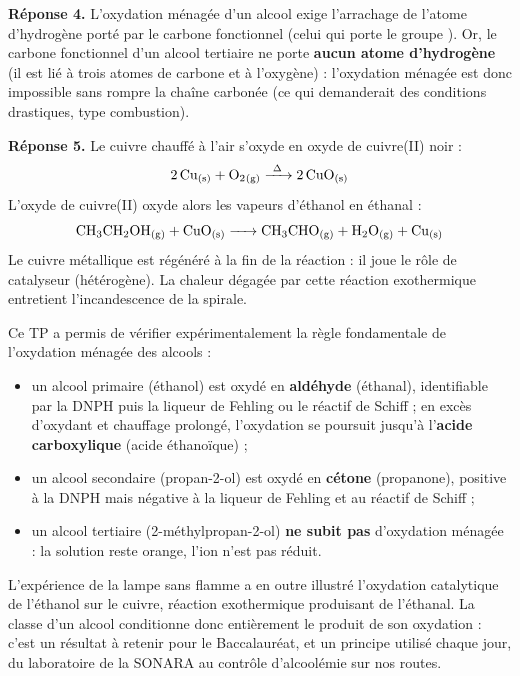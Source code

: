 \documentclass[11pt]{article}
\newcommand{\cle}[1]{{\popxbold\color{popdark}#1}}
\newcounter{popsec}
\newcounter{popsub}
\newcommand{\courssub}[1]{%
  \stepcounter{popsub}%
  \par\vspace{9pt}\noindent{\popxbold\fontsize{11.5}{13}\selectfont\color{popink}{\color{poporange}\thepopsec.\thepopsub}\hspace{6pt}#1}\par\nopagebreak\vspace{4pt}
}
\begin{document}
\begin{exoresolu}
\textbf{Réponse 4.} L'oxydation ménagée d'un alcool exige l'arrachage de l'atome d'hydrogène porté par le carbone fonctionnel (celui qui porte le groupe ). Or, le carbone fonctionnel d'un alcool tertiaire ne porte \textbf{aucun atome d'hydrogène} (il est lié à trois atomes de carbone et à l'oxygène) : l'oxydation ménagée est donc impossible sans rompre la chaîne carbonée (ce qui demanderait des conditions drastiques, type combustion).

\textbf{Réponse 5.} Le cuivre chauffé à l'air s'oxyde en oxyde de cuivre(II) noir  :
\[ \ce{2 Cu_{(s)} + O2_{(g)} ->[\Delta] 2 CuO_{(s)}} \]
L'oxyde de cuivre(II) oxyde alors les vapeurs d'éthanol en éthanal :
\[ \ce{CH3CH2OH_{(g)} + CuO_{(s)} -> CH3CHO_{(g)} + H2O_{(g)} + Cu_{(s)}} \]
Le cuivre métallique est régénéré à la fin de la réaction : il joue le rôle de \cle{catalyseur} (hétérogène). La chaleur dégagée par cette réaction exothermique entretient l'incandescence de la spirale.
\end{exoresolu}

\courssub{Conclusion}

Ce TP a permis de vérifier expérimentalement la règle fondamentale de l'oxydation ménagée des alcools :
\begin{itemize}
\item un alcool \cle{primaire} (éthanol) est oxydé en \textbf{aldéhyde} (éthanal), identifiable par la DNPH puis la liqueur de Fehling ou le réactif de Schiff ; en excès d'oxydant et chauffage prolongé, l'oxydation se poursuit jusqu'à l'\textbf{acide carboxylique} (acide éthanoïque) ;
\item un alcool \cle{secondaire} (propan-2-ol) est oxydé en \textbf{cétone} (propanone), positive à la DNPH mais négative à la liqueur de Fehling et au réactif de Schiff ;
\item un alcool \cle{tertiaire} (2-méthylpropan-2-ol) \textbf{ne subit pas} d'oxydation ménagée : la solution reste orange, l'ion  n'est pas réduit.
\end{itemize}

L'expérience de la lampe sans flamme a en outre illustré l'oxydation catalytique de l'éthanol sur le cuivre, réaction exothermique produisant de l'éthanal. La classe d'un alcool conditionne donc entièrement le produit de son oxydation : c'est un résultat à retenir pour le Baccalauréat, et un principe utilisé chaque jour, du laboratoire de la SONARA au contrôle d'alcoolémie sur nos routes.

\newpage
\end{document}
